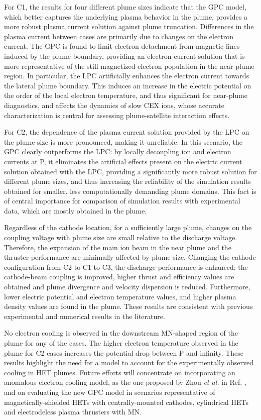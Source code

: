 \documentclass[%
 aip,
cha,
 amsmath,amssymb,
 reprint,%
]{revtex4-1}
\begin{document}
For C1, the results for four different plume sizes indicate that the GPC model, which better captures the underlying plasma behavior in the plume, provides a more robust plasma current solution against plume truncation. 
%
Differences in the plasma current between cases are primarily due to changes on the electron current. The GPC is found to limit electron detachment from magnetic lines induced by the plume boundary, providing an electron current solution that is more representative of the still magnetized electron population in the near plume region. 
In particular, the LPC artificially enhances the electron current towards the lateral plume boundary. This induces an increase in the electric potential on the order of the local electron temperature, and thus significant for near-plume diagnostics, and affects the dynamics of slow CEX ions, whose accurate characterization is central for assessing plume-satellite interaction effects.
%

For C2, the dependence of the plasma current solution provided by the LPC on the plume size is more pronounced, making it unreliable.
%
In this scenario, the GPC clearly outperforms the LPC: by locally decoupling ion and electron currents at P, it eliminates the artificial effects present on the electric current solution obtained with the LPC, providing a significantly more robust solution for different plume sizes, and thus increasing the reliability of the simulation results obtained for smaller, less computationally demanding plume domains. This fact is of central importance for comparison of simulation results with experimental data, which are mostly obtained in the plume.

Regardless of the cathode location, for a sufficiently large plume, changes on the coupling voltage with plume size are small relative to the discharge voltage. Therefore, the expansion of the main ion beam in the near plume and the thruster performance are minimally affected by plume size.
%
Changing the cathode configuration from C2 to C1 to C3, the discharge performance is enhanced: the cathode-beam coupling is improved, higher thrust and efficiency values are obtained and plume divergence and velocity dispersion is reduced. Furthermore, lower electric potential and electron temperature values, and higher plasma density values are found in the plume. These results are consistent with previous experimental and numerical results in the literature.


No electron cooling is observed in the downstream MN-shaped region of the plume for any of the cases. The higher electron temperature observed in the plume for C2 cases increases the potential drop between P and infinity. These results highlight the need for a model to account for the experimentally observed cooling in HET plumes.
%
Future efforts will concentrate on incorporating an anomalous electron cooling model, as the one proposed by Zhou \textit{et al.} in Ref. , and on evaluating the new GPC model in scenarios representative of magnetically-shielded HETs with centrally-mounted cathodes, cylindrical HETs and electrodeless plasma thrusters with MN.
\end{document}
